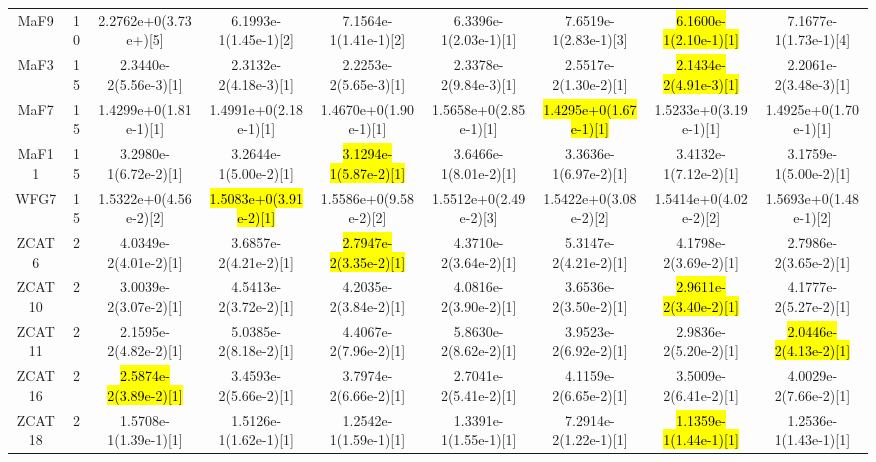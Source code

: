 \documentclass[a4paper,fleqn]{cas-dc}
\newcommand{\highlight}[1]{
	\begingroup
	\sethlcolor{Seashell}%
	\hl{#1}%
	\endgroup
}
\begin{document}
\begin{sloppypar}
\begin{table}[h]
{\begin{tabular}{ccccccccc}
				MaF9&10&2.2762e+0(3.73e+)[5] &6.1993e-1(1.45e-1)[2]	&7.1564e-1(1.41e-1)[2]	&6.3396e-1(2.03e-1)[1]	 &7.6519e-1(2.83e-1)[3]	&\highlight{6.1600e-1(2.10e-1)[1]}	&7.1677e-1(1.73e-1)[4]	\\
				
				
				MaF3&15&2.3440e-2(5.56e-3)[1] &2.3132e-2(4.18e-3)[1]	&2.2253e-2(5.65e-3)[1]	&2.3378e-2(9.84e-3)[1]	&2.5517e-2(1.30e-2)[1]	&\highlight{2.1434e-2(4.91e-3)[1]}	&2.2061e-2(3.48e-3)[1]	\\
				
				
				MaF7&15&1.4299e+0(1.81e-1)[1] &1.4991e+0(2.18e-1)[1]	&1.4670e+0(1.90e-1)[1]	&1.5658e+0(2.85e-1)[1]	&\highlight{1.4295e+0(1.67e-1)[1]}	&1.5233e+0(3.19e-1)[1]	&1.4925e+0(1.70e-1)[1]	\\
				
				
				MaF11&15&3.2980e-1(6.72e-2)[1] &3.2644e-1(5.00e-2)[1]	&\highlight{3.1294e-1(5.87e-2)[1]}	&3.6466e-1(8.01e-2)[1]	&3.3636e-1(6.97e-2)[1]	&3.4132e-1(7.12e-2)[1]	&3.1759e-1(5.00e-2)[1]	\\
				
				WFG7&15&1.5322e+0(4.56e-2)[2] &\highlight{1.5083e+0(3.91e-2)[1]}	&1.5586e+0(9.58e-2)[2]	&1.5512e+0(2.49e-2)[3]	&1.5422e+0(3.08e-2)[2]	&1.5414e+0(4.02e-2)[2]	&1.5693e+0(1.48e-1)[2]	\\
				
				ZCAT6&2&4.0349e-2(4.01e-2)[1] &3.6857e-2(4.21e-2)[1]	&\highlight{2.7947e-2(3.35e-2)[1]}	&4.3710e-2(3.64e-2)[1]	&5.3147e-2(4.21e-2)[1]	&4.1798e-2(3.69e-2)[1]	&2.7986e-2(3.65e-2)[1]	\\
				
				ZCAT10&2&3.0039e-2(3.07e-2)[1] &4.5413e-2(3.72e-2)[1]	&4.2035e-2(3.84e-2)[1]	&4.0816e-2(3.90e-2)[1]	&3.6536e-2(3.50e-2)[1]	&\highlight{2.9611e-2(3.40e-2)[1]}	&4.1777e-2(5.27e-2)[1]	\\
				
				ZCAT11&2&2.1595e-2(4.82e-2)[1] &5.0385e-2(8.18e-2)[1]	&4.4067e-2(7.96e-2)[1]	&5.8630e-2(8.62e-2)[1]	&3.9523e-2(6.92e-2)[1]	&2.9836e-2(5.20e-2)[1]	&\highlight{2.0446e-2(4.13e-2)[1]}	\\
				
				ZCAT16&2&\highlight{2.5874e-2(3.89e-2)[1]} &3.4593e-2(5.66e-2)[1]	&3.7974e-2(6.66e-2)[1]	&2.7041e-2(5.41e-2)[1]	&4.1159e-2(6.65e-2)[1]	&3.5009e-2(6.41e-2)[1]	&4.0029e-2(7.66e-2)[1]	\\
				
				ZCAT18&2&1.5708e-1(1.39e-1)[1] &1.5126e-1(1.62e-1)[1]	&1.2542e-1(1.59e-1)[1]	&1.3391e-1(1.55e-1)[1]	&7.2914e-2(1.22e-1)[1]	&\highlight{1.1359e-1(1.44e-1)[1]}	&1.2536e-1(1.43e-1)[1]	\\
				

\end{tabular}}
\end{table}
\end{sloppypar}
\end{document}
